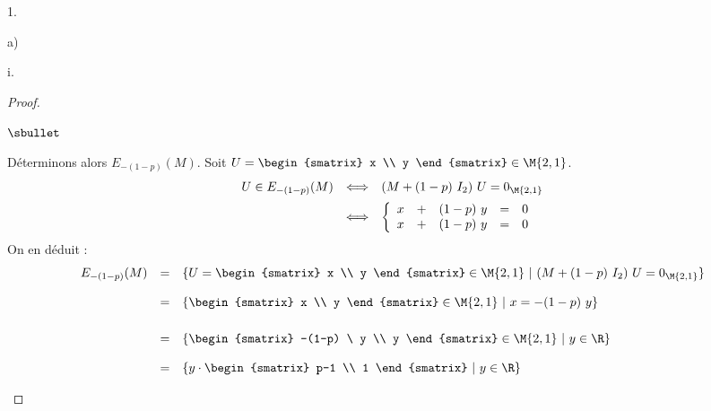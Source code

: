 \documentclass[11pt]{article}%
\begin{document}
\begin{noliste}{1.}
\begin{noliste}{a)}
\begin{nonoliste}{i.}
\begin{proof}
\begin{noliste}{$\sbullet$}
        \item Déterminons alors $E_{-(1-p)}(M)$. Soit $U =
          \begin{smatrix}
            x \\
            y 
          \end{smatrix}
          \in \M{2,1}
          $.
          \[
          \begin{array}{rcl}
            U \in E_{-(1-p)}(M) & \Longleftrightarrow & (M + (1-p) \ I_2) \ U
            = 0_{\M{2,1}} 
            \\[.2cm]
            & \Longleftrightarrow & 
            \left\{
              \begin{array}{rcrcc}
                x & + & (1-p) \ y & = & 0 \\
                x & + & (1-p) \ y & = & 0 
              \end{array}
            \right. %
          \end{array}
          \]
          On en déduit :
          \[
          \begin{array}{rcl}
            E_{-(1-p)}(M) & = & \{U =
            \begin{smatrix}
              x \\
              y 
            \end{smatrix}
            \in \M{2,1}
            \ | \ 
            (M + (1-p) \ I_2) \ U = 0_{\M{2,1}}
            \}
            \\[.4cm]
            & = & \{
            \begin{smatrix}
              x \\
              y 
            \end{smatrix}
            \in \M{2,1}        
            \ | \ 
            x = -(1-p) \ y
            \}
            \\[.6cm]
            & = & \{
            \begin{smatrix}
              -(1-p) \ y \\
              y 
            \end{smatrix}
            \in \M{2,1}        
            \ | \ 
            y \in \R
            \}
            \\[.4cm]
            & = & \{
            y \cdot
            \begin{smatrix}
              p-1 \\
              1 
            \end{smatrix}
            \ | \ 
            y \in \R
            \}

\end{array}\]
\end{noliste}
\end{proof}
\end{nonoliste}
\end{noliste}
\end{noliste}
\end{document}
